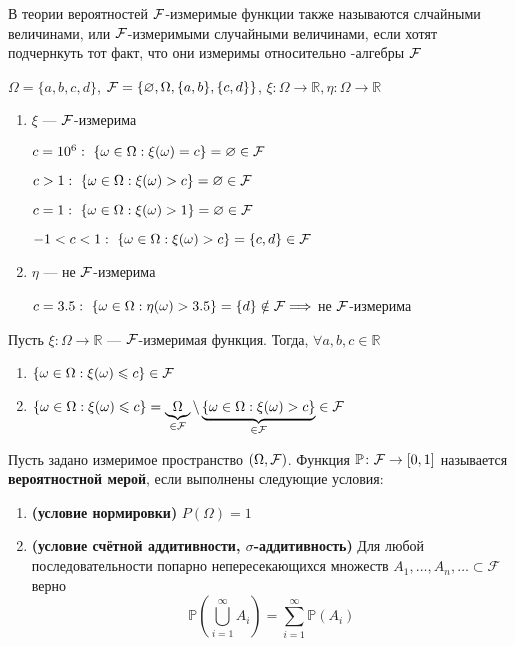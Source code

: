 \documentclass[a4paper, 10pt]{article}
\begin{document}
 В теории вероятностей $\mathcal{F}$-измеримые функции также называются слчайными величинами, или $\mathcal{F}$-измеримыми случайными величинами, если хотят подчернкуть тот факт, что они измеримы относительно \s-алгебры $\mathcal{F}$

\ex $\Omega=\{a,b,c,d\}$, $\mathcal{F}=\{\varnothing, \Omega, \{a,b\}, \{c,d\}\}$, $\xi:\Omega\rightarrow\mathbb{R},\eta:\Omega\rightarrow\mathbb{R}$
\begin{enumerate}
    \item $\xi$ — $\mathcal{F}$-измерима
    
    $c=10^6:\ \{\omega\in\Omega:\xi(\omega)=c\}=\varnothing\in\fk$
    
    $c>1:\ \{\omega\in\Omega:\xi(\omega)>c\}=\varnothing\in\fk$

    $c=1:\ \{\omega\in\Omega:\xi(\omega)>1\}=\varnothing\in\fk$

    $-1<c<1:\ \{\omega\in\Omega:\xi(\omega)>c\}=\{c,d\}\in\fk$
    \item $\eta$ — не $\mathcal{F}$-измерима
    
    $c=3.5:\ \{\omega\in\Omega:\eta(\omega)>3.5\}=\{d\}\notin\fk\Longrightarrow$ не $\mathcal{F}$-измерима 
\end{enumerate}

\theorem Пусть $\xi:\Omega\rightarrow\mathbb{R}$ — $\mathcal{F}$-измеримая функция. Тогда, $\forall a,b,c\in\mathbb{R}$
\begin{enumerate}
    \item $\{\omega\in\Omega:\xi(\omega)\leqslant c\}\in\mathcal{F}$
    \item 
    \proof $\{\omega\in\Omega:\xi(\omega)\leqslant c\}=\underbrace{\Omega}_{\in\mathcal{F}}\setminus\underbrace{\{\omega\in\Omega:\xi(\omega)>c\}}_{\in\mathcal{F}}\in\mathcal{F}$
\end{enumerate}

 Пусть задано измеримое пространство $(\Omega, \mathcal{F})$. Функция $\mathbb{P}\colon\mathcal{F}\to[0,1]$ называется \textbf{вероятностной мерой}, если выполнены следующие условия:
\begin{enumerate}
    \item \textbf{(условие нормировки)} $P(\Omega)=1$
    \item \textbf{(условие счётной аддитивности, $\sigma$-аддитивность)} Для любой последовательности попарно непересекающихся множеств $A_1,\dots,A_n,\dots\subset\mathcal{F}$ верно
    $$\mathbb{P}\left(\bigcup^\infty_{i=1}A_i\right)=\sum^\infty_{i=1}\mathbb{P}(A_i)$$
    
\end{enumerate}
\end{document}

